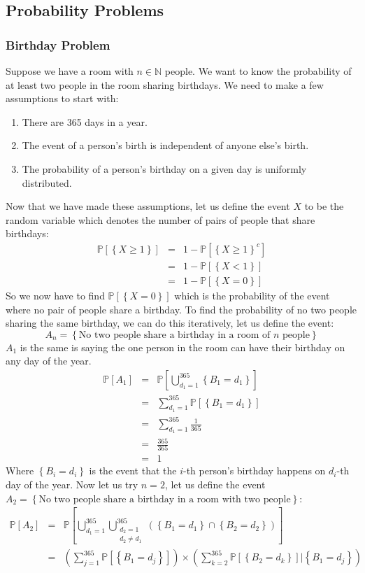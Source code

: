 \documentclass[11pt]{article}
\theoremstyle{definition}
\newcommand{\brac}[1]{\left(#1\right)}
\newcommand{\curlbrac}[1]{\left\{#1\right\}}
\newcommand{\N}{\mathbb{N}}
\newcommand{\prob}[1]{\mathbb{P}\left[#1\right]}
\begin{document}
\subsection{Probability Problems}
\subsubsection{Birthday Problem}
	Suppose we have a room with $n\in\N$ people. We want to know the probability of at least two people in the room sharing birthdays. We need to make a few assumptions to start with:
	\begin{enumerate}
		\item There are 365 days in a year.
		\item The event of a person's birth is independent of anyone else's birth.
		\item The probability of a person's birthday on a given day is uniformly distributed.
	\end{enumerate}
	Now that we have made these assumptions, let us define the event $X$ to be the random variable which denotes the number of pairs of people that share birthdays:
	\begin{eqnarray*}
	\prob{\curlbrac{X\geq 1}} &=& 1- \prob{\curlbrac{X\geq 1}^c}\\
	&=&1-\prob{\curlbrac{X<1}}\\
	&=&1-\prob{\curlbrac{X = 0}}
	\end{eqnarray*}
	So we now have to find $\prob{\curlbrac{X=0}}$ which is the probability of the event where no pair of people share a birthday. To find the probability of no two people sharing the same birthday, we can do this iteratively, let us define the event:
	$$A_n = \curlbrac{\text{No two people share a birthday in a room of $n$ people}}$$
	$A_1$ is the same is saying the one person in the room can have their birthday on any day of the year. 
	\begin{eqnarray*}
		\prob{A_1} &=& \prob{\bigcup_{d_1 = 1}^{365}\curlbrac{B_1 = d_1}}\\
		&=& \sum_{d_1=1}^{365}\prob{\curlbrac{B_1 = d_1}}\\
		&=& \sum_{d_1=1}^{365}\frac{1}{365}\\
		&=&\frac{365}{365}\\
		&=&1
	\end{eqnarray*}
	Where $\curlbrac{B_i = d_i}$ is the event that the $i$-th person's birthday happens on $d_i$-th day of the year. Now let us try $n=2$, let us define the event $A_2 = \curlbrac{\text{No two people share a birthday in a room with two people}}$:
	\begin{eqnarray*}
		\prob{A_2} &=& \prob{\bigcup_{d_1=1}^{365}\bigcup_{\substack{d_2=1\\ d_2\neq d_1}}^{365}\brac{\curlbrac{B_1 = d_1}\cap\curlbrac{B_2=d_2}}}\\
		&=& \brac{\sum_{j=1}^{365}\prob{\curlbrac{B_1 = d_j}}}\times\brac{\sum_{k=2}^{365}\prob{\curlbrac{B_2 = d_k}}|\curlbrac{B_1 = d_j}}
	\end{eqnarray*}
	
\end{document}
